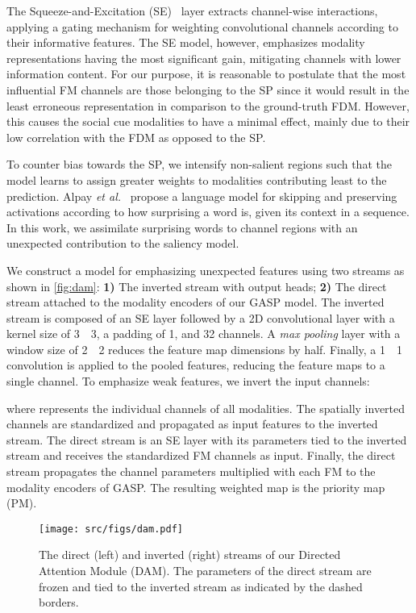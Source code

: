 \documentclass{article}
\begin{document}
The Squeeze-and-Excitation (SE)~\cite{hu2018squeeze} layer extracts channel-wise interactions, applying a gating mechanism for weighting convolutional channels according to their informative features. The SE model, however, emphasizes modality representations having the most significant gain, mitigating channels with lower information content. For our purpose, it is reasonable to postulate that the most influential FM channels are those belonging to the SP since it would result in the least erroneous representation in comparison to the ground-truth FDM. However, this causes the social cue modalities to have a minimal effect, mainly due to their low correlation with the FDM as opposed to the SP.

To counter bias towards the SP, we intensify non-salient regions such that the model learns to assign greater weights to modalities contributing least to the prediction. Alpay \textit{et al.}~ propose a language model for skipping and preserving activations according to how surprising a word is, given its context in a sequence.
In this work, we assimilate surprising words to channel regions with an unexpected contribution to the saliency model.

We construct a model for emphasizing unexpected features using two streams as shown in \autoref{fig:dam}: \textbf{1)} The inverted stream with output heads; \textbf{2)} The direct stream attached to the modality encoders of our GASP model. The inverted stream is composed of an SE layer followed by a 2D convolutional layer with a kernel size of 3~~3, a padding of 1, and 32 channels. A \textit{max pooling} layer with a window size of 2~~2 reduces the feature map dimensions by half. Finally, a 1~~1 convolution is applied to the pooled features, reducing the feature maps to a single channel. 
To emphasize weak features, we invert the input channels:

where  represents the individual channels of all modalities. The spatially inverted channels  are standardized and propagated as input features to the inverted stream. The direct stream is an SE layer with its parameters tied to the inverted stream and receives the standardized FM channels  as input. Finally, the direct stream propagates the channel parameters multiplied with each FM to the modality encoders of GASP. The resulting weighted map is the priority map (PM).

\begin{figure}[t]
\centering
\texttt{[image: src/figs/dam.pdf]}
\caption{The direct (left) and inverted (right) streams of our Directed Attention Module (DAM). The parameters of the direct stream are frozen and tied to the inverted stream as indicated by the dashed borders.}
\label{fig:dam}
\end{figure}
\end{document}

